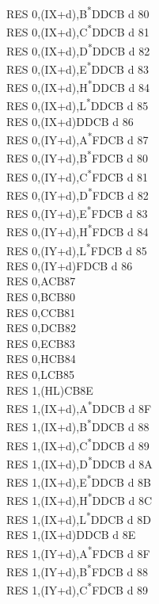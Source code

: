 \documentclass[oneside,a4paper]{book}
\begin{document}
\begin{multicols}{3}
{\begin{tabbing}
RES 0,(IX+d),B\textsuperscript{*}\>DDCB d 80\\
RES 0,(IX+d),C\textsuperscript{*}\>DDCB d 81\\
RES 0,(IX+d),D\textsuperscript{*}\>DDCB d 82\\
RES 0,(IX+d),E\textsuperscript{*}\>DDCB d 83\\
RES 0,(IX+d),H\textsuperscript{*}\>DDCB d 84\\
RES 0,(IX+d),L\textsuperscript{*}\>DDCB d 85\\
RES 0,(IX+d)\>DDCB d 86\\
RES 0,(IY+d),A\textsuperscript{*}\>FDCB d 87\\
RES 0,(IY+d),B\textsuperscript{*}\>FDCB d 80\\
RES 0,(IY+d),C\textsuperscript{*}\>FDCB d 81\\
RES 0,(IY+d),D\textsuperscript{*}\>FDCB d 82\\
RES 0,(IY+d),E\textsuperscript{*}\>FDCB d 83\\
RES 0,(IY+d),H\textsuperscript{*}\>FDCB d 84\\
RES 0,(IY+d),L\textsuperscript{*}\>FDCB d 85\\
RES 0,(IY+d)\>FDCB d 86\\
RES 0,A\>CB87\\
RES 0,B\>CB80\\
RES 0,C\>CB81\\
RES 0,D\>CB82\\
RES 0,E\>CB83\\
RES 0,H\>CB84\\
RES 0,L\>CB85\\
RES 1,(HL)\>CB8E\\
RES 1,(IX+d),A\textsuperscript{*}\>DDCB d 8F\\
RES 1,(IX+d),B\textsuperscript{*}\>DDCB d 88\\
RES 1,(IX+d),C\textsuperscript{*}\>DDCB d 89\\
RES 1,(IX+d),D\textsuperscript{*}\>DDCB d 8A\\
RES 1,(IX+d),E\textsuperscript{*}\>DDCB d 8B\\
RES 1,(IX+d),H\textsuperscript{*}\>DDCB d 8C\\
RES 1,(IX+d),L\textsuperscript{*}\>DDCB d 8D\\
RES 1,(IX+d)\>DDCB d 8E\\
RES 1,(IY+d),A\textsuperscript{*}\>FDCB d 8F\\
RES 1,(IY+d),B\textsuperscript{*}\>FDCB d 88\\
RES 1,(IY+d),C\textsuperscript{*}\>FDCB d 89\\

\end{tabbing}}
\end{multicols}
\end{document}
